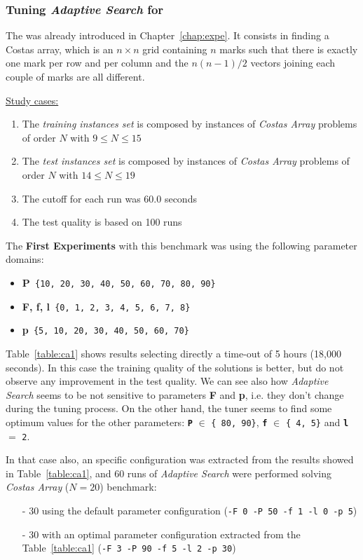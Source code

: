 
\subsubsection{ Tuning {\it Adaptive Search} for  \carrp}

The \carrp{} was already introduced in Chapter~\ref{chap:expe}. It consists in finding a Costas array, which is an $n\times n$ grid containing $n$ marks such that there is exactly one mark per row and per column and the $n(n-1)/2$ vectors joining each couple of marks are all different.

\underline{Study cases:}
\begin{enumerate}
	\item The {\it training instances set} is composed by instances of {\it Costas Array} problems of order $N$ with $9 \leq N \leq 15$
	\item The {\it test instances set} is composed by instances of {\it Costas Array} problems of order $N$ with $14 \leq N \leq 19$
	\item The cutoff for each run was 60.0 seconds
	\item The test quality is based on 100 runs
\end{enumerate}

The {\bf First Experiments} with this benchmark was using the following parameter domains:
\begin{itemize}[itemsep=0.2mm]
	\item {\bf P}\texttt{ \{10, 20, 30, 40, 50, 60, 70, 80, 90\}}
	\item {\bf F, f, l}\texttt{ \{0, 1, 2, 3, 4, 5, 6, 7, 8\}}
	\item {\bf p}\texttt{ \{5, 10, 20, 30, 40, 50, 60, 70\}}
\end{itemize}

Table~\ref{table:ca1} shows results selecting directly a time-out of 5 hours (18,000 seconds). In this case the training quality of the solutions is better, but do not observe any improvement in the test quality. We can see also how {\it Adaptive Search} seems to be not sensitive to parameters {\bf F} and {\bf p}, i.e. they don't change during the tuning process. On the other hand, the tuner seems to find some optimum values for the other parameters: \texttt{\bf P} $\in$ \texttt{\{ 80, 90\}}, \texttt{\bf f} $\in$ \texttt{\{ 4, 5\}} and \texttt{\bf l} $=$ \texttt{2}.

In that case also, an specific configuration was extracted from the results showed in Table~\ref{table:ca1}, and 60 runs of {\it Adaptive Search} were performed solving {\it Costas Array} ($N = 20$) benchmark: 
\begin{itemize}
	\item[-] 30 using the default parameter configuration (\texttt{-F 0 -P 50 -f 1 -l 0 -p 5})
	\item[-] 30 with an optimal parameter configuration extracted from the Table~\ref{table:ca1} (\texttt{-F 3 -P 90 -f 5 -l 2 -p 30}) 
\end{itemize}

